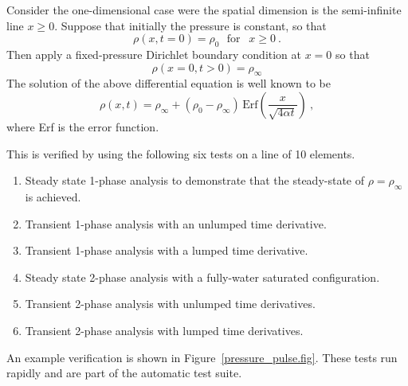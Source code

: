 \documentclass[]{scrreprt}
\begin{document}
Consider the one-dimensional case were the spatial dimension is the
semi-infinite line $x\geq 0$.  Suppose that initially the pressure is
constant, so that
\begin{equation}
\rho(x, t=0) = \rho_{0} \ \ \ \mbox{for }\ \ x\geq 0 \ .
\end{equation}
Then apply a fixed-pressure Dirichlet boundary condition at $x=0$ so
that
\begin{equation}
\rho(x=0, t>0) = \rho_{\infty}
\end{equation}
The solution of the above differential equation is well known to be
\begin{equation}
\rho(x, t) = \rho_{\infty} + (\rho_{0} -
\rho_{\infty})\,\mbox{Erf}\left( \frac{x}{\sqrt{4\alpha t}} \right) \ ,
\label{eqn.exact.pp}
\end{equation}
where Erf is the error function.

This is verified by using the following six tests on a line of
10 elements.
\begin{enumerate}
\item Steady state 1-phase analysis to demonstrate that the
  steady-state of $\rho = \rho_{\infty}$ is achieved.
\item Transient 1-phase analysis with an unlumped time derivative.
\item Transient 1-phase analysis with a lumped time derivative.
\item Steady state 2-phase analysis with a fully-water saturated configuration.
\item Transient 2-phase analysis with unlumped time derivatives.
\item Transient 2-phase analysis with lumped time derivatives.
\end{enumerate}
An example verification is shown in Figure~\ref{pressure_pulse.fig}.
These tests run rapidly and are part of the automatic test suite.
\end{document}
